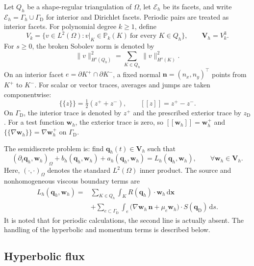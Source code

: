 \documentclass[pdflatex,sn-mathphys-num]{sn-jnl}%
\theoremstyle{thmstyleone}%
\theoremstyle{thmstyletwo}%
\theoremstyle{thmstylethree}%
\begin{document}
Let $Q_h$ be a shape-regular triangulation of $\Omega$, let $\mathcal E_h$ be its facets, and write $\mathcal E_h=\Gamma_h\cup\Gamma_{\mathrm D}$ for 
interior and Dirichlet facets. Periodic pairs are treated as interior facets. For polynomial degree $k\ge1$, define
\[
V_k=\{v\in L^2(\Omega):v|_K\in\mathbb P_k(K)\ \text{for every }K\in Q_h\},
\qquad \mathbf V_h=V_k^3.
\]
For $s\ge0$, the broken Sobolev norm is denoted by
\[
\|v\|_{H^s(Q_h)}^2=\sum_{K\in Q_h}\|v\|_{H^s(K)}^2.
\]
On an interior facet $e=\partial K^+\cap\partial K^-$, a fixed normal $\mathbf n=(n_x,n_y)^\top$ points from $K^+$ to $K^-$. For scalar or vector traces, averages and jumps are taken componentwise:
\[
\{\!\{z\}\!\}=\tfrac12(z^++z^-),\qquad [[z]]=z^+-z^-.
\]
On $\Gamma_{\mathrm D}$, the interior trace is denoted by $z^+$ and the prescribed exterior trace by $z_{\mathrm D}$.
For a test function $\mathbf w_h$, the exterior trace is zero, so $[[\mathbf w_h]]=\mathbf w_h^+$ and $\{\!\{\nabla\mathbf w_h\}\!\}=\nabla\mathbf w_h^+$ on $\Gamma_{\mathrm D}$.

The semidiscrete problem is: find $\mathbf q_h(t)\in\mathbf V_h$ such that
\begin{equation}
\label{eq4}
(\partial_t\mathbf q_h,\mathbf w_h)_\Omega
+b_h(\mathbf q_h,\mathbf w_h)+a_h(\mathbf q_h,\mathbf w_h)
=L_h(\mathbf q_h,\mathbf w_h),
\qquad\forall\mathbf w_h\in\mathbf V_h.
\end{equation}
Here, $(\cdot, \cdot)_{\Omega}$ denotes the standard $L^2(\Omega)$ inner product.
The source and nonhomogeneous viscous boundary terms are
\begin{equation}
\label{eq5}
\begin{aligned}
L_h(\mathbf q_h,\mathbf w_h)
={}&\sum_{K\in Q_h}\int_K R(\mathbf q_h)\cdot\mathbf w_h\,\mathrm d\mathbf x\\
&+\sum_{e\subset\Gamma_{\mathrm D}}\int_e
\bigl(\nabla\mathbf w_h\,\mathbf n+\mu_e\mathbf w_h\bigr)\cdot S(\mathbf q_{\mathrm D})\,\mathrm ds.
\end{aligned}
\end{equation}
It is noted that for periodic calculations, the second line is actually absent.
The handling of the hyperbolic and momentum terms is described below.


\subsection{Hyperbolic flux}
\end{document}

